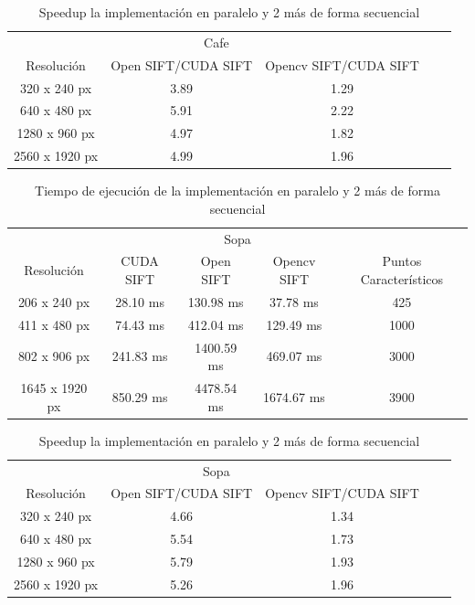 \begin{table}[phtb]
\centering
\begin{tabular}{|c|c|c|c|c|}
\hline
\multicolumn{3}{|c|}{Cafe} \\
\cline{1-3}
Resolución & Open SIFT/CUDA SIFT & Opencv SIFT/CUDA SIFT \\
\hline \hline
 320 x 240 px  & 3.89   &  1.29   \\ \cline{1-3}
 640 x 480 px  & 5.91   &  2.22  \\ \cline{1-3}
1280 x 960 px  & 4.97   &  1.82  \\ \cline{1-3}
2560 x 1920 px & 4.99   &  1.96 \\ \cline{1-3}
\end{tabular}
\caption{Speedup la implementación en paralelo y 2 más de forma secuencial}
\label{tabla:final}
\end{table}

\begin{table}[phtb]
\centering
\begin{tabular}{|c|c|c|c|c|}
\hline
\multicolumn{5}{|c|}{Sopa} \\
\cline{1-5}
Resolución & CUDA SIFT & Open SIFT & Opencv SIFT & Puntos Característicos\\
\hline \hline
 206 x 240 px  & 28.10 ms  &  130.98 ms  & 37.78 ms   & 425\\ \cline{1-5}
 411 x 480 px  & 74.43 ms  &  412.04 ms  & 129.49 ms  & 1000\\ \cline{1-5}
 802 x 906 px  & 241.83 ms &  1400.59 ms & 469.07 ms  & 3000\\ \cline{1-5}
1645 x 1920 px & 850.29 ms &  4478.54 ms & 1674.67 ms & 3900\\ \cline{1-5}
\end{tabular}
\caption{Tiempo de ejecución de la implementación en paralelo y 2 más de forma secuencial}
\label{tabla:final}
\end{table}

\begin{table}[phtb]
\centering
\begin{tabular}{|c|c|c|c|c|}
\hline
\multicolumn{3}{|c|}{Sopa} \\
\cline{1-3}
Resolución & Open SIFT/CUDA SIFT & Opencv SIFT/CUDA SIFT \\
\hline \hline
 320 x 240 px  &  4.66  &  1.34   \\ \cline{1-3}
 640 x 480 px  &  5.54  &  1.73  \\ \cline{1-3}
1280 x 960 px  &  5.79  &  1.93  \\ \cline{1-3}
2560 x 1920 px &  5.26  &  1.96 \\ \cline{1-3}
\end{tabular}
\caption{Speedup la implementación en paralelo y 2 más de forma secuencial}
\label{tabla:final}
\end{table}

